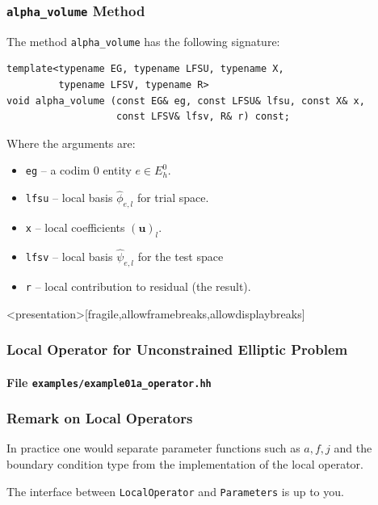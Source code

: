 \begin{frame}[fragile]
\frametitle{\lstinline{alpha_volume} Method}
The method \lstinline{alpha_volume} has the following signature: 
\begin{lstlisting}[basicstyle=\scriptsize]
template<typename EG, typename LFSU, typename X, 
         typename LFSV, typename R>
void alpha_volume (const EG& eg, const LFSU& lfsu, const X& x, 
                   const LFSV& lfsv, R& r) const;
\end{lstlisting}
Where the arguments are:
\begin{itemize}
\item \lstinline{eg} -- a codim 0 entity $e\in E_h^0$.
\item \lstinline{lfsu} -- local basis $\hat\phi_{e,l}$ for trial space.
\item \lstinline{x} -- local coefficients $(\mathbf{u})_l$.
\item \lstinline{lfsv} -- local basis $\hat\psi_{e,l}$ for the test space 
\item \lstinline{r} -- local contribution to residual (the result).
\end{itemize}
\end{frame}


\begin{frame}<presentation>[fragile,allowframebreaks,allowdisplaybreaks]
\frametitle<presentation>{Local Operator for Unconstrained Elliptic Problem}
\framesubtitle<presentation>{File \texttt{examples/example01a\_operator.hh}}

\end{frame}

\begin{frame}
\frametitle{Remark on Local Operators}
In practice one would separate parameter functions such as $a, f, j$ and the boundary condition
type from the implementation of the local operator.

\begin{center}
\end{center}
The interface between \lstinline{LocalOperator} and \lstinline{Parameters} is up to you.
\end{frame}



